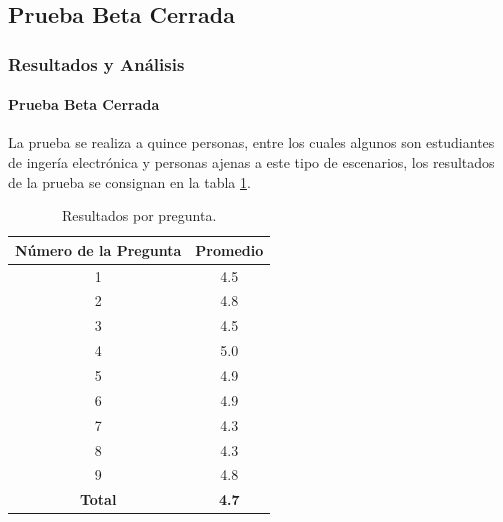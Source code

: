 \subsection{Prueba Beta Cerrada}
\begin{frame}[t]
\frametitle{Resultados y Análisis}
\framesubtitle{Prueba Beta Cerrada}
\footnotesize %
La prueba se realiza a quince personas, entre los cuales algunos son estudiantes de ingería electrónica y personas ajenas a este tipo de escenarios, los resultados de la prueba se consignan en la tabla \ref{table:enc}.

\begin{table}[H]
	\begin{center}
		\caption{Resultados por pregunta.}
		\label{table:enc}
		\begin{tabular}{|c|c|}
			\hline 
			\textbf{Número de la Pregunta} & \textbf{Promedio} \\ 
			\hline 
			1 & 4.5\\ 
			\hline 
			2 & 4.8\\ 
			\hline 
			3 & 4.5\\ 
			\hline 
			4 & 5.0\\ 
			\hline 
			5 & 4.9\\ 
			\hline 
			6 & 4.9\\ 
			\hline 
			7 & 4.3\\ 
			\hline 
			8 & 4.3\\ 
			\hline 
			9 & 4.8\\ 
			\hline 
			\textbf{Total} & \textbf{4.7}\\ 
			\hline 
		\end{tabular} 
	\end{center}
\end{table}


\end{frame}